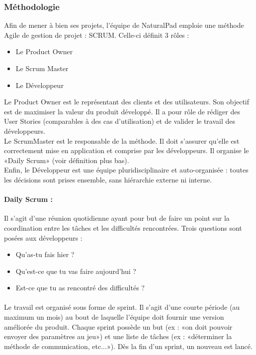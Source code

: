 	\subsubsection{Méthodologie}
Afin de mener à bien ses projets, l’équipe de NaturalPad emploie une méthode Agile de gestion de projet : SCRUM.
Celle-ci définit 3 rôles :
	\begin{itemize}
		\item Le Product Owner
		\item Le Scrum Master
		\item Le Développeur
	\end {itemize}
Le Product Owner est le représentant des clients et des utilisateurs. Son objectif est de maximiser la valeur du produit développé. Il a pour rôle de rédiger des User Stories (comparables à des cas d'utilisation) et de valider le travail des développeurs. 
\\Le ScrumMaster est le responsable de la méthode. Il doit s’assurer qu’elle est correctement mise en application et comprise par les développeurs. Il organise le «Daily Scrum» (voir définition plus bas).
\\Enfin, le Développeur est une équipe pluridisciplinaire et auto-organisée : toutes les décisions sont prises ensemble, sans hiérarchie externe ni interne.
 
		\paragraph{Daily Scrum :}
Il s’agit d’une réunion quotidienne ayant pour but de faire un point sur la coordination entre les tâches et les difficultés rencontrées.  Trois questions sont posées aux développeurs : 
	\begin{itemize}
		\item Qu’as-tu fais hier ?
		\item Qu’est-ce que tu vas faire aujourd’hui ?
		\item Est-ce que tu as rencontré des difficultés ?
	\end {itemize}
	
\paragraph{}Le travail est organisé sous forme de sprint. Il s’agit d’une courte période (au maximum un mois) au bout de laquelle l’équipe doit fournir une version améliorée du produit. Chaque sprint possède un but (ex : «on doit pouvoir envoyer des paramètres au jeu») et une liste de tâches (ex : «déterminer la méthode de communication, etc...»). Dès la fin d’un sprint, un nouveau est lancé.

